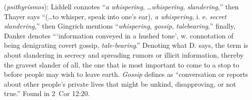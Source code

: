 \item[Gossip,]

(\textit{psithyrismos}):
Liddell connotes ``\emph{a whispering}, \ldots \emph{whispering}, \emph{slandering},'' then Thayer says ``(\ldots to whisper, speak into one's ear), \emph{a whispering}, i. e. \emph{secret slandering},'' then Gingrich mentions ``\emph{whispering}, \emph{gossip}, \emph{talebearing},'' finally, Danker denotes ```information conveyed in a hushed tone', w. connotation of being denigrating covert gossip, \emph{tale-bearing}.'' Denoting what D. says, the term is about slandering in secrecy and spreading rumors or illicit information, thereby the gravest slander of all, the one that is most important to come to a stop to before people may wish to leave earth. \emph{Gossip} defines as ``conversation or reports about other people's private lives that might be unkind, disapproving, or not true.''
Found in 2~Cor 12:20.
